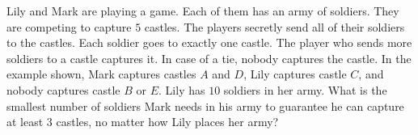 Lily and Mark are playing a game. Each of them has an army of soldiers. They are competing to capture $5$ castles. The players secretly send all of their soldiers to the castles. Each soldier goes to exactly one castle. The player who sends more soldiers to a castle captures it. In case of a tie, nobody captures the castle. In the example shown, Mark captures castles $A$ and $D$, Lily captures castle $C$, and nobody captures castle $B$ or $E$. Lily has $10$ soldiers in her army. What is the smallest number of soldiers Mark needs in his army to guarantee he can capture at least $3$ castles, no matter how Lily places her army?
